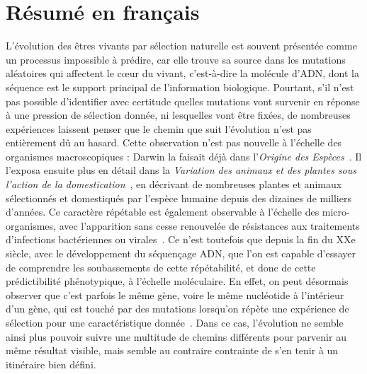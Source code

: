 
\chapter{Résumé en français}

L'évolution des êtres vivants par sélection naturelle est souvent présentée comme un processus impossible à prédire, car elle trouve sa source dans les mutations aléatoires qui affectent le cœur du vivant, c'est-à-dire la molécule d'ADN, dont la séquence est le support principal de l'information biologique.
Pourtant, s'il n'est pas possible d'identifier avec certitude quelles mutations vont survenir en réponse à une pression de sélection donnée, ni lesquelles vont être fixées, de nombreuses expériences laissent penser que le chemin que suit l'évolution n'est pas entièrement dû au hasard.
Cette observation n'est pas nouvelle à l'échelle des organismes macroscopiques : Darwin la faisait déjà dans l'\emph{Origine des Espèces}~\citep{darwin1859}.
Il l'exposa ensuite plus en détail dans la \emph{Variation des animaux et des plantes sous l'action de la domestication}~\citep{darwin1868}, en décrivant de nombreuses plantes et animaux sélectionnés et domestiqués par l'espèce humaine depuis des dizaines de milliers d'années.
Ce caractère répétable est également observable à l'échelle des micro-organismes, avec l'apparition sans cesse renouvelée de résistances aux traitements d'infections bactériennes ou virales~\citep{levy2004}.
Ce n'est toutefois que depuis la fin du XXe siècle, avec le développement du séquençage ADN, que l'on est capable d'essayer de comprendre les soubassements de cette répétabilité, et donc de cette prédictibilité phénotypique, à l'échelle moléculaire.
En effet, on peut désormais observer que c'est parfois le même gène, voire le même nucléotide à l'intérieur d'un gène, qui est touché par des mutations lorsqu'on répète une expérience de sélection pour une caractéristique donnée~\citep{wortel2021}.
Dans ce cas, l'évolution ne semble ainsi plus pouvoir suivre une multitude de chemins différents pour parvenir au même résultat visible, mais semble au contraire contrainte de s'en tenir à un itinéraire bien défini.

